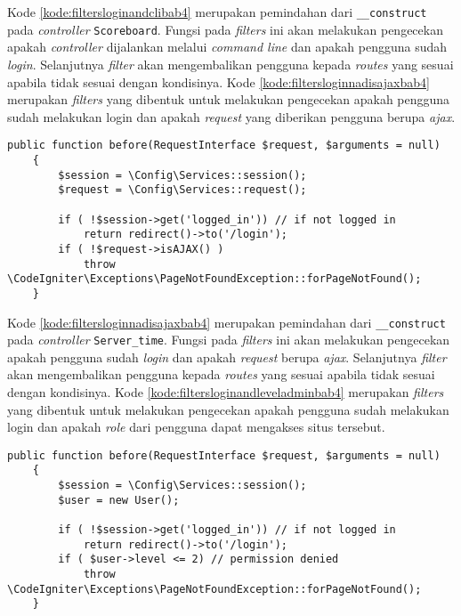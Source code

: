 Kode \ref{kode:filtersloginandclibab4} merupakan pemindahan dari \texttt{\_\_construct} pada \textit{controller}  \texttt{Scoreboard}. Fungsi pada \textit{filters} ini akan melakukan pengecekan apakah \textit{controller} dijalankan melalui \textit{command line} dan apakah pengguna sudah \textit{login}. Selanjutnya \textit{filter} akan mengembalikan pengguna kepada \textit{routes} yang sesuai apabila tidak sesuai dengan kondisinya. Kode \ref{kode:filtersloginnadisajaxbab4} merupakan \textit{filters} yang dibentuk untuk melakukan pengecekan apakah pengguna sudah melakukan login dan apakah \textit{request} yang diberikan pengguna berupa \textit{ajax}.

\begin{lstlisting}[caption=Pemindahan kode pada \textit{Filters} \texttt{CheckLoginandisAjax.php}, label=kode:filtersloginnadisajaxbab4]
	public function before(RequestInterface $request, $arguments = null)
    {   
        $session = \Config\Services::session();
        $request = \Config\Services::request();

		if ( !$session->get('logged_in')) // if not logged in
			return redirect()->to('/login');
        if ( !$request->isAJAX() )
			throw \CodeIgniter\Exceptions\PageNotFoundException::forPageNotFound();
    }
\end{lstlisting}

Kode \ref{kode:filtersloginnadisajaxbab4} merupakan pemindahan dari \texttt{\_\_construct} pada \textit{controller}  \texttt{Server\_time}. Fungsi pada \textit{filters} ini akan melakukan pengecekan apakah pengguna sudah \textit{login} dan apakah \textit{request} berupa \textit{ajax}. Selanjutnya \textit{filter} akan mengembalikan pengguna kepada \textit{routes} yang sesuai apabila tidak sesuai dengan kondisinya. Kode \ref{kode:filtersloginandleveladminbab4} merupakan \textit{filters} yang dibentuk untuk melakukan pengecekan apakah pengguna sudah melakukan login dan apakah \textit{role} dari pengguna dapat mengakses situs tersebut.

\begin{lstlisting}[caption=Pemindahan kode pada \textit{Filters} \texttt{CheckLoginandLevelAdmin.php}, label=kode:filtersloginandleveladminbab4]
	public function before(RequestInterface $request, $arguments = null)
    {   
        $session = \Config\Services::session();
        $user = new User();

		if ( !$session->get('logged_in')) // if not logged in
			return redirect()->to('/login');
        if ( $user->level <= 2) // permission denied
			throw \CodeIgniter\Exceptions\PageNotFoundException::forPageNotFound();	
    }
\end{lstlisting}

